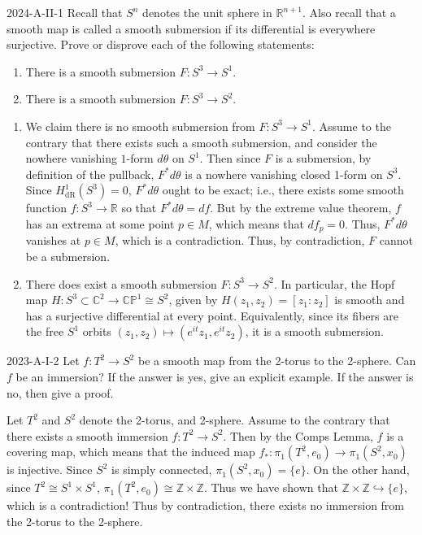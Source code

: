 \documentclass{article}
\newcommand{\embedd}{\hookrightarrow}
\begin{document}
	
	\begin{prb}{2024-A-II-1}
		Recall that $S^{n}$ denotes the unit sphere in $\mathbb{R}^{n + 1}$. Also recall that a smooth map is called a smooth submersion if its differential is everywhere surjective. Prove or disprove each of the following statements: \vspace{-0.25cm}
		\begin{enumerate}[itemsep =-2pt,label = (\alph{*})]
			\item There is a smooth submersion $F: S^{3} \to S^{1}$. 
			\item There is a smooth submersion $F: S^{3} \to S^{2}$. 
		\end{enumerate}
	\end{prb}
	\begin{enumerate}[itemsep =-2pt,label = (\alph{*})]
		\item We claim there is no smooth submersion from $F: S^{3} \to S^{1}$. Assume to the contrary that there exists such a smooth submersion, and consider the nowhere vanishing $1$-form $d\theta$ on $S^{1}$. Then since $F$ is a submersion, by definition of the pullback, $F^{\ast}d\theta$ is a nowhere vanishing closed 1-form on $S^{3}$. Since $H^{1}_{\text{dR}}(S^{3}) = 0$, $F^{\ast}d\theta$ ought to be exact; i.e., there exists some smooth function $f: S^{3} \to \mathbb{R}$ so that $F^{\ast}d\theta = df$. But by the extreme value theorem, $f$ has an extrema at some point $p \in M$, which means that $df_{p} = 0$. Thus, $F^{\ast}d\theta$ vanishes at $p \in M$, which is a contradiction. Thus, by contradiction, $F$ cannot be a submersion. 
		\item There does exist a smooth submersion $F: S^{3} \to S^{2}$. In particular, the Hopf map $H: S^{3} \subset \mathbb{C}^{2} \to \mathbb{CP}^{1}\cong S^{2}$, given by $H(z_{1}, z_{2}) = [z_{1}: z_{2}]$ is smooth and has a surjective differential at every point. Equivalently, since its fibers are the free $S^{1}$ orbits $(z_{1}, z_{2}) \mapsto (e^{it}z_{1}, e^{it}z_{2})$, it is a smooth submersion. 
	\end{enumerate}
	
	\begin{prb}{2023-A-I-2}
		Let $f: T^{2} \to S^{2}$ be a smooth map from the 2-torus to the 2-sphere. Can $f$ be an immersion? If the answer is yes, give an explicit example. If the answer is no, then give a proof. 
	\end{prb}
	Let $T^{2}$ and $S^{2}$ denote the 2-torus, and 2-sphere. Assume to the contrary that there exists a smooth immersion $f: T^{2} \to S^{2}$. Then by the Comps Lemma, $f$ is a covering map, which means that the induced map $f_{\ast}:\pi_{1}(T^{2}, e_{0})\to \pi_{1}(S^{2}, x_{0})$ is injective. Since $S^{2}$ is simply connected, $\pi_{1}(S^{2}, x_{0}) = \{e\}$. On the other hand, since $T^{2} \cong S^{1} \times S^{1}$, 
	$\pi_{1}(T^{2}, e_{0}) \cong \mathbb{Z} \times \mathbb{Z}$. Thus we have shown that $\mathbb{Z} \times \mathbb{Z} \embedd \{e\}$, which is a contradiction! Thus by contradiction, there exists no immersion from the 2-torus to the 2-sphere. 
	
\end{document}
